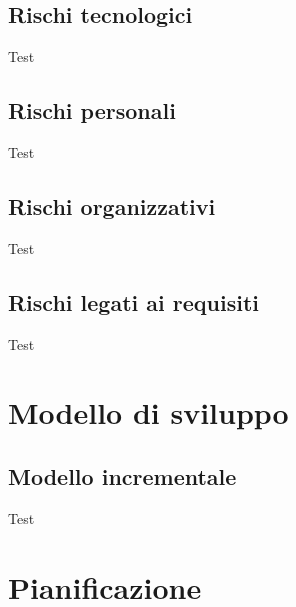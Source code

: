 \subsection{Rischi tecnologici}
Test

\subsection{Rischi personali}
Test

\subsection{Rischi organizzativi}
Test

\subsection{Rischi legati ai requisiti}
Test

\section{Modello di sviluppo}
\subsection{Modello incrementale} %
Test

\section{Pianificazione}
